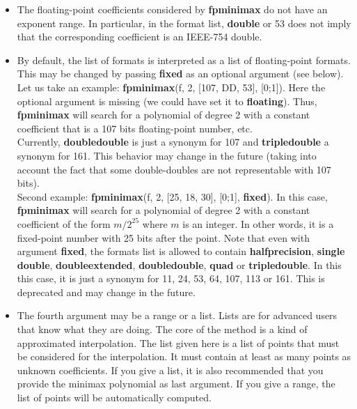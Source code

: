 \begin{itemize}
\item The floating-point coefficients considered by \textbf{fpminimax} do not have an
   exponent range. In particular, in the format list, \textbf{double} or 53 does not
   imply that the corresponding coefficient is an IEEE-754 double.

\item By default, the list of formats is interpreted as a list of floating-point
   formats. This may be changed by passing \textbf{fixed} as an optional argument (see
   below). Let us take an example: \textbf{fpminimax}(f, 2, [107, DD, 53], [0;1]).
   Here the optional argument is missing (we could have set it to \textbf{floating}).
   Thus, \textbf{fpminimax} will search for a polynomial of degree 2 with a constant 
   coefficient that is a 107 bits floating-point number, etc.\\
   Currently, \textbf{doubledouble} is just a synonym for 107 and \textbf{tripledouble} a 
   synonym for 161. This behavior may change in the future (taking into
   account the fact that some double-doubles are not representable with
   107 bits).\\
   Second example: \textbf{fpminimax}(f, 2, [25, 18, 30], [0;1], \textbf{fixed}).
   In this case, \textbf{fpminimax} will search for a polynomial of degree 2 with a
   constant coefficient of the form $m/2^{25}$ where $m$ is an
   integer. In other words, it is a fixed-point number with 25 bits after
   the point. Note that even with argument \textbf{fixed}, the formats list is 
   allowed to contain \textbf{halfprecision}, \textbf{single} \textbf{double}, \textbf{doubleextended}, 
   \textbf{doubledouble}, \textbf{quad} or \textbf{tripledouble}. In this this case, it is just 
   a synonym for 11, 24, 53, 64, 107, 113 or 161. This is deprecated and 
   may change in the future.

\item The fourth argument may be a range or a list. Lists are for advanced users
   that know what they are doing. The core of the  method is a kind of
   approximated interpolation. The list given here is a list of points that
   must be considered for the interpolation. It must contain at least as 
   many points as unknown coefficients. If you give a list, it is also 
   recommended that you provide the minimax polynomial as last argument.
   If you give a range, the list of points will be automatically computed.


\end{itemize}
